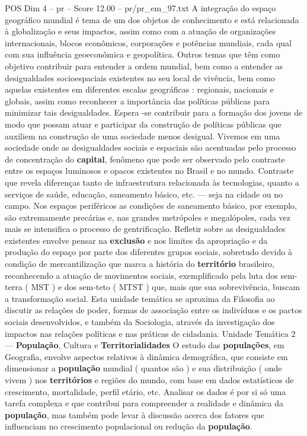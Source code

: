 \begin{textsample}{POS Dim 4 – pr – Score 12.00 – pr/pr\_em\_97.txt}
A integração do espaço geográfico mundial é tema de um dos objetos de conhecimento e está relacionada à globalização e seus impactos, assim como com a atuação de organizações internacionais, blocos econômicos, corporações e potências mundiais, cada qual com sua influência geoeconômica e geopolítica.
Outros temas que têm como objetivo contribuir para entender a ordem mundial, bem como a entender as desigualdades socioespaciais existentes no seu local de vivência, bem como aquelas existentes em diferentes escalas geográficas : regionais, nacionais e globais, assim como reconhecer a importância das políticas públicas para minimizar tais desigualdades.
Espera -se contribuir para a formação dos jovens de modo que possam atuar e participar da construção de políticas públicas que auxiliem na construção de uma sociedade menos desigual.
Vivemos em uma sociedade onde as desigualdades sociais e espaciais são acentuadas pelo processo de concentração do \textbf{capital}, fenômeno que pode ser observado pelo contraste entre os espaços luminosos e opacos existentes no Brasil e no mundo.
Contraste que revela diferenças tanto de infraestrutura relacionada às tecnologias, quanto a serviços de saúde, educação, saneamento básico, etc. — seja na cidade ou no campo.
Nos espaços periféricos as condições de saneamento básico, por exemplo, são extremamente precárias e, nas grandes metrópoles e megalópoles, cada vez mais se intensifica o processo de gentrificação.
Refletir sobre as desigualdades existentes envolve pensar na \textbf{exclusão} e nos limites da apropriação e da produção do espaço por parte dos diferentes grupos sociais, sobretudo devido à condição de mercantilização que marca a história do \textbf{território} brasileiro, reconhecendo a atuação de movimentos sociais, exemplificado pela luta dos sem-terra ( MST ) e dos sem-teto ( MTST ) que, mais que sua sobrevivência, buscam a transformação social.
Esta unidade temática se aproxima da Filosofia ao discutir as relações de poder, formas de associação entre os indivíduos e os pactos sociais desenvolvidos, e também da Sociologia, através da investigação dos impactos nas relações políticas e nas práticas de cidadania.
Unidade Temática 2 — \textbf{População}, Cultura e \textbf{Territorialidades} O estudo das \textbf{populações}, em Geografia, envolve aspectos relativos à dinâmica demográfica, que consiste em dimensionar a \textbf{população} mundial ( quantos são ) e sua distribuição ( onde vivem ) nos \textbf{territórios} e regiões do mundo, com base em dados estatísticos de crescimento, mortalidade, perfil etário, etc.
Analisar os dados é por si só uma tarefa complexa e que contribui para compreender a realidade e dinâmica da \textbf{população}, mas também pode levar à discussão acerca dos fatores que influenciam no crescimento populacional ou redução da \textbf{população}.

\end{textsample}

